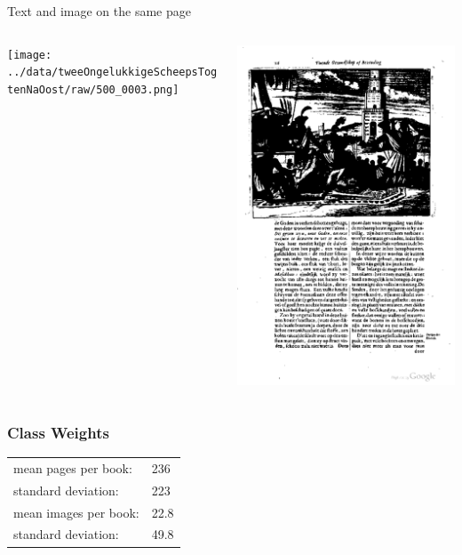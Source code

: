 {
	Text and image on the same page
	\begin{columns}
		\begin{column}{.5\textwidth}
			\texttt{[image: ../data/tweeOngelukkigeScheepsTogtenNaOost/raw/500\_0003.png]}
		\end{column}
		\begin{column}{.5\textwidth}
			\includegraphics[width=.9\columnwidth]{resources/text_and_image_example}
		\end{column}
	\end{columns}
}

\begin{frame}
\frametitle{Class Weights}

\begin{center}
\begin{tabular}{l l}
mean pages per book: & 236\\
standard deviation: & 223\\
mean images per book: & 22.8\\
standard deviation: & 49.8
\end{tabular}
\end{center}
\end{frame}

